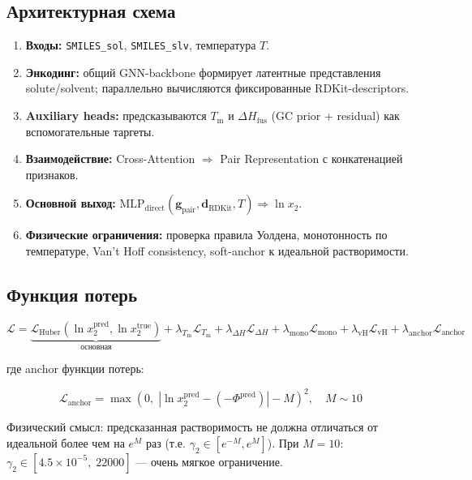 \documentclass[11pt]{article}
\begin{document}
\subsection{Архитектурная схема}
\begin{enumerate}
  \item \textbf{Входы:} \texttt{SMILES\_sol}, \texttt{SMILES\_slv}, температура $T$.
  \item \textbf{Энкодинг:} общий GNN-backbone формирует латентные представления solute/solvent; параллельно вычисляются фиксированные RDKit-descriptors.
  \item \textbf{Auxiliary heads:} предсказываются $T_{\mathrm{m}}$ и $\Delta H_{\mathrm{fus}}$ (GC prior + residual) как вспомогательные таргеты.
  \item \textbf{Взаимодействие:} Cross-Attention $\Rightarrow$ Pair Representation с конкатенацией признаков.
  \item \textbf{Основной выход:} $\mathrm{MLP}_{\mathrm{direct}}(\mathbf{g}_{\mathrm{pair}}, \mathbf{d}_{\mathrm{RDKit}}, T) \Rightarrow \ln x_2$.
  \item \textbf{Физические ограничения:} проверка правила Уолдена, монотонность по температуре, Van't Hoff consistency, soft-anchor к идеальной растворимости.
\end{enumerate}

\subsection{Функция потерь}

\begin{equation*}
\mathcal{L} = \underbrace{\mathcal{L}_{\mathrm{Huber}}(\ln x_2^{\mathrm{pred}}, \ln x_2^{\mathrm{true}})}_{\text{основная}} + \lambda_{T_{\mathrm{m}}}\mathcal{L}_{T_{\mathrm{m}}} + \lambda_{\Delta H}\mathcal{L}_{\Delta H} + \lambda_{\mathrm{mono}}\mathcal{L}_{\mathrm{mono}} + \lambda_{\mathrm{vH}}\mathcal{L}_{\mathrm{vH}} + \lambda_{\mathrm{anchor}}\mathcal{L}_{\mathrm{anchor}}
\end{equation*}

где anchor функции потерь:

\begin{equation*}
\mathcal{L}_{\mathrm{anchor}} = \max\!\left(0,\; \left|\ln x_2^{\mathrm{pred}} - (-\Phi^{\mathrm{pred}})\right| - M\right)^2, \quad M \sim 10
\end{equation*}

Физический смысл: предсказанная растворимость не должна отличаться от идеальной более чем на $e^{M}$ раз (т.е. $\gamma_2 \in [e^{-M}, e^{M}]$). При $M = 10$: $\gamma_2 \in [4.5 \times 10^{-5},\; 22000]$ --- очень мягкое ограничение.
\end{document}
